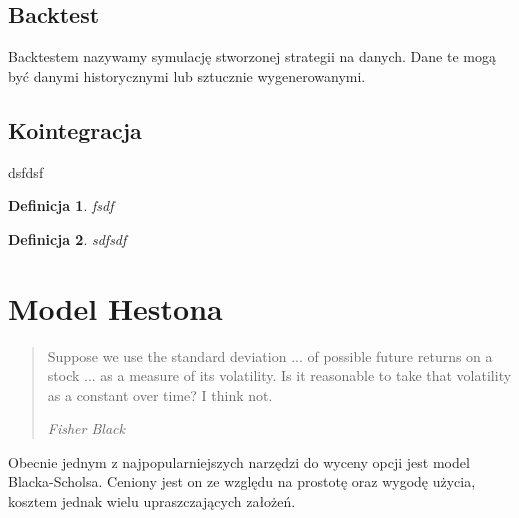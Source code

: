 \documentclass{pracamgr}
\newtheorem{defi}{Definicja}[section]
\begin{document}

\section{Backtest}
Backtestem nazywamy symulację stworzonej strategii na danych. Dane te mogą
być danymi historycznymi lub sztucznie wygenerowanymi.

\section{Kointegracja}
dsfdsf

\begin{defi}\label{aa}
fsdf
\end{defi}

\begin{defi}\label{aaa}
sdfsdf
\end{defi}




%
%
\chapter{Model Hestona}
\label{chap:hestonModel}
\begin{quote}
  Suppose we use the standard deviation ... of possible future returns on
  a stock ... as a measure of its volatility. Is it reasonable to take
  that volatility as a constant over time? I think not.

\raggedleft\slshape Fisher Black 
\end{quote}


Obecnie jednym z najpopularniejszych narzędzi do wyceny opcji jest model Blacka-Scholsa. Ceniony jest on ze względu na prostotę oraz wygodę użycia, kosztem jednak wielu upraszczających założeń. 
\end{document}

